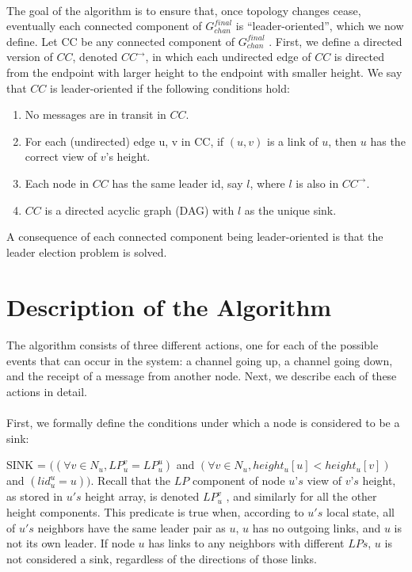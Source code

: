 \paragraph{}The goal of the algorithm is to ensure that, once topology changes cease, eventually each connected component of $G_{chan} ^{final}$ is “leader-oriented”, which we now define. Let CC be any connected component of $G_{chan} ^{final}$ . First, we define a directed version of $CC$, denoted $CC^{\longrightarrow}$, in which each undirected edge of $CC$ is directed from the endpoint with larger height to the endpoint with smaller height. We say that $CC$ is leader-oriented if the following conditions hold:
\begin{enumerate}
	\item No messages are in transit in $CC$.
	\item For each (undirected) edge {u, v} in CC, if $(u, v)$ is a link of $u$, then $u$ has the correct view of $v$’s height.
	\item  Each node in $CC$ has the same leader id, say $l$, where $l$ is also in $CC^{\longrightarrow}$. 
	\item  $CC$ is a directed acyclic graph (DAG) with $l$ as the unique sink.
\end{enumerate}
A consequence of each connected component being leader-oriented is that the leader election problem is solved.
\section{Description of the Algorithm}
\paragraph{}The algorithm consists of three different actions, one for each of the possible events that can occur in the system: a channel going up, a channel going down, and the receipt of a message from another node. Next, we describe each of these actions in detail.
\paragraph{}First, we formally define the conditions under which a node is considered to be a sink:
\begin{list}{--}{spacing}
	\item SINK = $((\forall v \in N_u, LP_u ^v = LP_u ^u )$ and $(\forall v \in N_u, height_u[u] < height_u[v])$ and $(lid_u ^u = u))$. Recall that the $LP$ component of node $u’s$ view of $v’s$ height, as stored in $u's$ height array, is denoted $LP_u ^v$ , and similarly for all the other height components. This predicate is true when, according to $u's$ local state, all of $u's$ neighbors have the same leader pair as $u$, $u$ has no outgoing links, and $u$ is not its own leader. If node $u$ has links to any neighbors with different $LPs$, $u$ is not considered a sink, regardless of the directions of those links.
\end{list}
